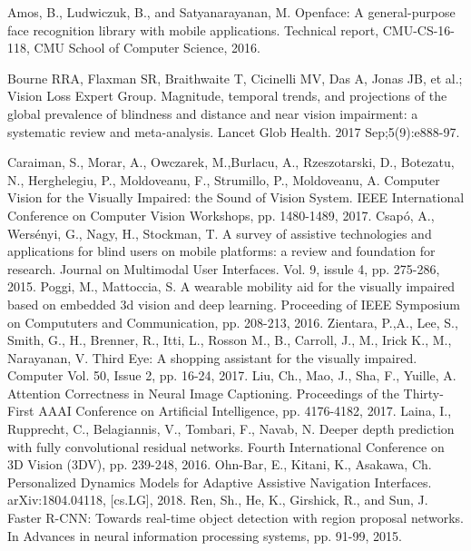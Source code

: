 \documentclass[10pt,conference,compsocconf]{IEEEtran}
\begin{document}
\begin{thebibliography}{1}
 Amos, B., Ludwiczuk, B., and Satyanarayanan, M. Openface:
A general-purpose face recognition library with mobile applications. Technical report, CMU-CS-16-118, CMU School of Computer Science, 2016.

 Bourne RRA, Flaxman SR, Braithwaite T, Cicinelli MV, Das A, Jonas JB, et al.; Vision Loss Expert Group. Magnitude, temporal trends, and projections of the global prevalence of blindness and distance and near vision impairment: a systematic review and meta-analysis. Lancet Glob Health.  2017 Sep;5(9):e888-97.

 Caraiman, S., Morar, A., Owczarek, M.,Burlacu, A., Rzeszotarski, D., Botezatu, N., Herghelegiu, P., Moldoveanu, F., Strumillo, P., Moldoveanu, A. Computer Vision for the Visually Impaired: the Sound of Vision System. IEEE International Conference on Computer Vision Workshops, pp. 1480-1489, 2017.
 Csap\'{o}, A., Wers\'{e}nyi, G., Nagy, H., Stockman, T. A survey of assistive technologies and applications for blind users on mobile platforms: a review and foundation for research. Journal on Multimodal User Interfaces. Vol. 9, issule 4,  pp. 275-286, 2015.
 Poggi, M., Mattoccia, S. A wearable mobility aid for the visually impaired based on embedded 3d vision and deep learning. Proceeding of IEEE Symposium on Compututers and Communication, pp. 208-213, 2016.
 Zientara, P.,A., Lee, S., Smith, G., H., Brenner, R., Itti, L., Rosson M., B., Carroll, J., M., Irick K., M., Narayanan, V. Third Eye: A shopping assistant for the visually impaired. Computer Vol. 50, Issue 2, pp. 16-24, 2017.
 Liu, Ch., Mao, J., Sha, F., Yuille, A. Attention Correctness in Neural Image Captioning. Proceedings of the Thirty-First AAAI Conference on Artificial Intelligence, pp. 4176-4182, 2017.
 Laina, I., Rupprecht, C., Belagiannis, V., Tombari, F., Navab, N. Deeper depth prediction with fully convolutional residual networks. Fourth International Conference on 3D Vision (3DV), pp. 239-248, 2016.
  Ohn-Bar, E., Kitani, K., Asakawa, Ch. Personalized Dynamics Models for Adaptive Assistive Navigation Interfaces. arXiv:1804.04118, [cs.LG], 2018.
 Ren, Sh., He, K., Girshick, R., and Sun, J.  Faster R-CNN: Towards real-time object detection with region proposal networks. In Advances in neural information processing systems, pp. 91-99, 2015.


\end{thebibliography}
\end{document}
